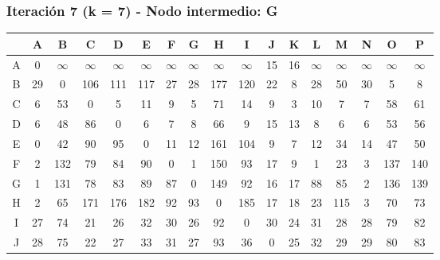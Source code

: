 \documentclass[12pt]{article}
\begin{document}
\subsubsection{Iteración 7 (k = 7) - Nodo intermedio: G}
\begin{table}[h!]
\centering
\begin{tabular}{|c|c|c|c|c|c|c|c|c|c|c|c|c|c|c|c|c|}
\hline
 & A & B & C & D & E & F & G & H & I & J & K & L & M & N & O & P \\\hline
A & 0 & $\infty$ & $\infty$ & $\infty$ & $\infty$ & $\infty$ & $\infty$ & $\infty$ & $\infty$ & 15 & 16 & $\infty$ & $\infty$ & $\infty$ & $\infty$ & $\infty$ \\\hline
B & \cellcolor{lightgreen} 29 & 0 & \cellcolor{lightgreen} 106 & \cellcolor{lightgreen} 111 & \cellcolor{lightgreen} 117 & 27 & 28 & \cellcolor{lightgreen} 177 & \cellcolor{lightgreen} 120 & 22 & 8 & 28 & 50 & \cellcolor{lightgreen} 30 & 5 & 8 \\\hline
C & \cellcolor{lightgreen} 6 & 53 & 0 & 5 & 11 & 9 & 5 & 71 & 14 & 9 & 3 & 10 & 7 & \cellcolor{lightgreen} 7 & 58 & 61 \\\hline
D & 6 & 48 & \cellcolor{lightgreen} 86 & 0 & 6 & 7 & 8 & 66 & 9 & 15 & 13 & 8 & 6 & 6 & 53 & 56 \\\hline
E & 0 & 42 & \cellcolor{lightgreen} 90 & \cellcolor{lightgreen} 95 & 0 & 11 & 12 & \cellcolor{lightgreen} 161 & \cellcolor{lightgreen} 104 & 9 & 7 & 12 & 34 & \cellcolor{lightgreen} 14 & 47 & 50 \\\hline
F & \cellcolor{lightgreen} 2 & \cellcolor{lightgreen} 132 & \cellcolor{lightgreen} 79 & \cellcolor{lightgreen} 84 & \cellcolor{lightgreen} 90 & 0 & 1 & \cellcolor{lightgreen} 150 & \cellcolor{lightgreen} 93 & \cellcolor{lightgreen} 17 & 9 & 1 & 23 & \cellcolor{lightgreen} 3 & \cellcolor{lightgreen} 137 & \cellcolor{lightgreen} 140 \\\hline
G & 1 & 131 & 78 & 83 & 89 & 87 & 0 & 149 & 92 & 16 & 17 & 88 & 85 & 2 & 136 & 139 \\\hline
H & 2 & 65 & \cellcolor{lightgreen} 171 & \cellcolor{lightgreen} 176 & \cellcolor{lightgreen} 182 & 92 & 93 & 0 & \cellcolor{lightgreen} 185 & 17 & 18 & 23 & 115 & 3 & 70 & 73 \\\hline
I & \cellcolor{lightgreen} 27 & 74 & 21 & 26 & 32 & 30 & 26 & 92 & 0 & 30 & 24 & 31 & 28 & \cellcolor{lightgreen} 28 & 79 & 82 \\\hline
J & \cellcolor{lightgreen} 28 & 75 & 22 & 27 & 33 & 31 & 27 & 93 & 36 & 0 & 25 & 32 & 29 & \cellcolor{lightgreen} 29 & 80 & 83 \\\hline

\end{tabular}
\end{table}
\end{document}
